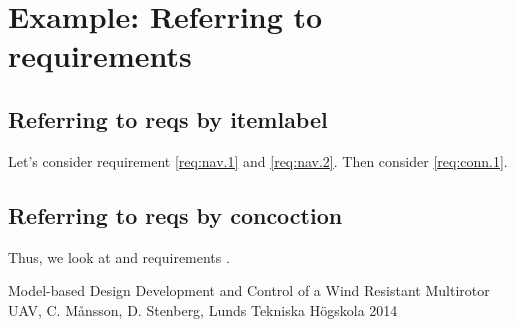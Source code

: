 \documentclass[a4paper]{article}
\begin{document}
\section{Example: Referring to requirements}
\subsection{Referring to reqs by itemlabel}
Let's consider requirement \ref{req:nav.1} and \ref{req:nav.2}. Then consider \ref{req:conn.1}.

\subsection{Referring to reqs by concoction}
Thus, we look at  and requirements .

\begin{thebibliography}{99}
 Model-based Design Development and Control of a Wind Resistant Multirotor UAV, C. Månsson, D. Stenberg, Lunds Tekniska Högskola 2014
\end{thebibliography}
\end{document}
